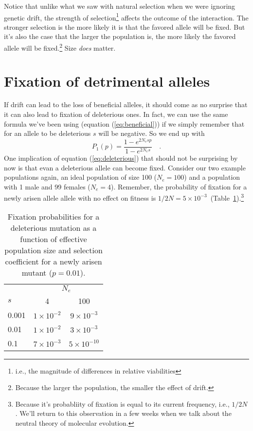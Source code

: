 Notice that unlike what we saw with natural selection when we were
ignoring genetic drift, the strength of selection\footnote{i.e., the
  magnitude of differences in relative viabilities} affects the
outcome of the interaction. The stronger selection is the more likely
it is that the favored allele will be fixed. But it's also the case
that the larger the population is, the more likely the favored allele
will be fixed.\footnote{Because the larger the population, the smaller
  the effect of drift.} Size {\it does\/} matter.

\section*{Fixation of detrimental alleles}

If drift can lead to the loss of beneficial alleles, it should come as
no surprise that it can also lead to fixation of deleterious ones. In
fact, we can use the same formula we've been using (equation
(\ref{eq:beneficial})) if we simply remember that for an allele to be
deleterious $s$ will be negative. So we end up with
\begin{equation}
P_1(p) = \frac{1 - e^{2N_esp}}{1 - e^{2N_es}} \quad .
\label{eq:deleterious}
\end{equation}
One implication of equation (\ref{eq:deleterious}) that should not be
surprising by now is that evan a deleterious allele can become
fixed. Consider our two example populations again, an ideal population
of size 100 ($N_e = 100$) and a population with 1 male and 99 females
($N_e = 4$). Remember, the probability of fixation for a newly arisen
allele allele with no effect on fitness is $1/2N = 5 \times
10^{-3}$~(Table~\ref{table:fixation}).\footnote{Because it's
  probabliity of fixation is equal to its current frequency, i.e.,
  $1/2N$. We'll return to this observation in a few weeks when we talk
  about the neutral theory of molecular evolution.}

\begin{table}
\begin{center}
\begin{tabular}{l|cc}
\hline\hline
      & \multicolumn{2}{c}{$N_e$} \\
$s$   & 4                  & 100 \\
\hline
0.001 & $1 \times 10^{-2}$ & $9 \times 10^{-3}$ \\
0.01  & $1 \times 10^{-2}$ & $3 \times 10^{-3}$ \\
0.1   & $7 \times 10^{-3}$ & $5 \times 10^{-10}$ \\
\hline
\end{tabular}
\end{center}
\caption{Fixation probabilities for a deleterious mutation as a
function of effective population size and selection coefficient for a
newly arisen mutant ($p=0.01$).}\label{table:fixation}
\end{table}

